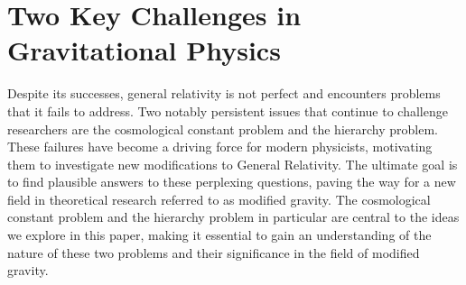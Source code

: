 \documentclass[11pt]{report}
\numberwithin{equation}{chapter}
\begin{document}
\section{Two Key Challenges in Gravitational Physics}
Despite its successes, general relativity is not perfect and encounters problems that it fails to address. Two notably persistent issues that continue to challenge researchers are the cosmological constant problem\cite{CCreview} and the hierarchy problem\cite{hierarchyreview}. These failures have become a driving force for modern physicists, motivating them to investigate new modifications to General Relativity. The ultimate goal is to find plausible answers to these perplexing questions, paving the way for a new field in theoretical research referred to as modified gravity. The cosmological constant problem and the hierarchy problem in particular are central to the ideas we explore in this paper, making it essential to gain an understanding of the nature of these two problems and their significance in the field of modified gravity.
\end{document}
